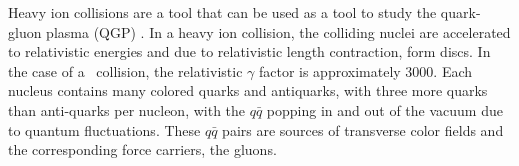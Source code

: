 
Heavy ion collisions are a tool that can be used as a tool to study the quark-gluon plasma (QGP) \cite{SHURYAK198071}.
In a heavy ion collision, the colliding nuclei are accelerated to relativistic energies and due to relativistic length contraction, form discs.
In the case of a \pbpb\ collision, the relativistic $\gamma$ factor is approximately 3000. 
Each nucleus contains many colored quarks and antiquarks, with three more quarks than anti-quarks per nucleon, with the $q\bar{q}$ popping in and out of the vacuum due to quantum fluctuations.
These $q\bar{q}$ pairs are sources of transverse color fields and the corresponding force carriers, the gluons.

%

